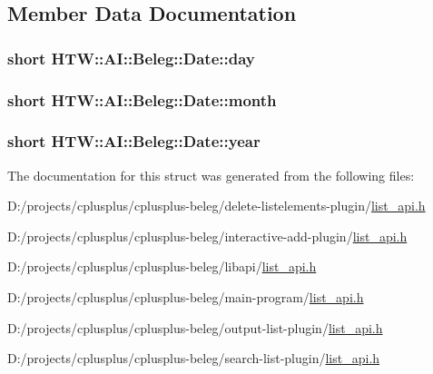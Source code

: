 \subsection{Member Data Documentation}
\hypertarget{struct_h_t_w_1_1_a_i_1_1_beleg_1_1_date_a45521e5b6c1574069b1e716552f465b1}{
\subsubsection[{day}]{\setlength{\rightskip}{0pt plus 5cm}short H\-T\-W\-::\-A\-I\-::\-Beleg\-::\-Date\-::day}}\label{struct_h_t_w_1_1_a_i_1_1_beleg_1_1_date_a45521e5b6c1574069b1e716552f465b1}
\hypertarget{struct_h_t_w_1_1_a_i_1_1_beleg_1_1_date_aa2233967e1888e3433a59d105d339374}{
\subsubsection[{month}]{\setlength{\rightskip}{0pt plus 5cm}short H\-T\-W\-::\-A\-I\-::\-Beleg\-::\-Date\-::month}}\label{struct_h_t_w_1_1_a_i_1_1_beleg_1_1_date_aa2233967e1888e3433a59d105d339374}
\hypertarget{struct_h_t_w_1_1_a_i_1_1_beleg_1_1_date_ae2dfadf9cf5c8a50b57678cf6a122332}{
\subsubsection[{year}]{\setlength{\rightskip}{0pt plus 5cm}short H\-T\-W\-::\-A\-I\-::\-Beleg\-::\-Date\-::year}}\label{struct_h_t_w_1_1_a_i_1_1_beleg_1_1_date_ae2dfadf9cf5c8a50b57678cf6a122332}


The documentation for this struct was generated from the following files\-:\begin{DoxyCompactItemize}
\item 
D\-:/projects/cplusplus/cplusplus-\/beleg/delete-\/listelements-\/plugin/\hyperlink{delete-listelements-plugin_2list__api_8h}{list\-\_\-api.\-h}\item 
D\-:/projects/cplusplus/cplusplus-\/beleg/interactive-\/add-\/plugin/\hyperlink{interactive-add-plugin_2list__api_8h}{list\-\_\-api.\-h}\item 
D\-:/projects/cplusplus/cplusplus-\/beleg/libapi/\hyperlink{libapi_2list__api_8h}{list\-\_\-api.\-h}\item 
D\-:/projects/cplusplus/cplusplus-\/beleg/main-\/program/\hyperlink{main-program_2list__api_8h}{list\-\_\-api.\-h}\item 
D\-:/projects/cplusplus/cplusplus-\/beleg/output-\/list-\/plugin/\hyperlink{output-list-plugin_2list__api_8h}{list\-\_\-api.\-h}\item 
D\-:/projects/cplusplus/cplusplus-\/beleg/search-\/list-\/plugin/\hyperlink{search-list-plugin_2list__api_8h}{list\-\_\-api.\-h}\end{DoxyCompactItemize}
